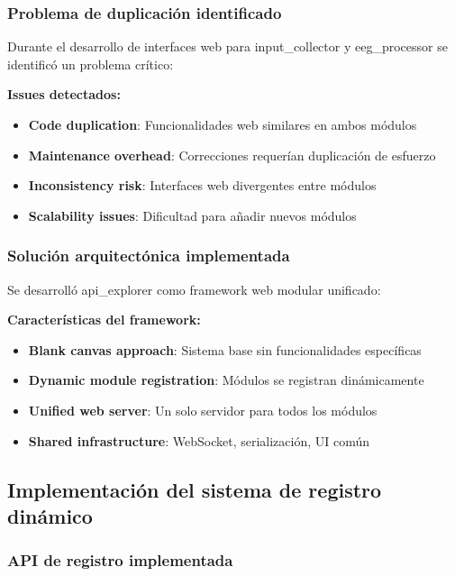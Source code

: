 \subsubsection{Problema de duplicación identificado}

Durante el desarrollo de interfaces web para input\_collector y eeg\_processor se identificó un problema crítico:

\textbf{Issues detectados:}
\begin{itemize}
    \item \textbf{Code duplication}: Funcionalidades web similares en ambos módulos
    \item \textbf{Maintenance overhead}: Correcciones requerían duplicación de esfuerzo
    \item \textbf{Inconsistency risk}: Interfaces web divergentes entre módulos
    \item \textbf{Scalability issues}: Dificultad para añadir nuevos módulos
\end{itemize}

\subsubsection{Solución arquitectónica implementada}

Se desarrolló api\_explorer como framework web modular unificado:

\textbf{Características del framework:}
\begin{itemize}
    \item \textbf{Blank canvas approach}: Sistema base sin funcionalidades específicas
    \item \textbf{Dynamic module registration}: Módulos se registran dinámicamente
    \item \textbf{Unified web server}: Un solo servidor para todos los módulos
    \item \textbf{Shared infrastructure}: WebSocket, serialización, UI común
\end{itemize}

\subsection{Implementación del sistema de registro dinámico}
\label{subsec:registro_dinamico}

\subsubsection{API de registro implementada}

